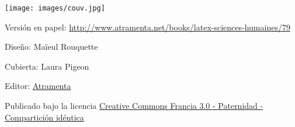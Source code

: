 \thispagestyle{empty}
\noindent\texttt{[image: images/couv.jpg]}
\restoregeometry

\null\vfill

{\small Versión en papel: \url{http://www.atramenta.net/books/latex-sciences-humaines/79}

Diseño: Maïeul Rouquette

Cubierta: Laura Pigeon

Editor: \href{http://www.atramenta.fr}{Atramenta}

Publicado bajo la licencia \href{http://creativecommons.org/licenses/by-sa/3.0/fr/}{Creative Commons Francia 3.0 - Paternidad - Compartición idéntica}}
\thispagestyle{empty}
